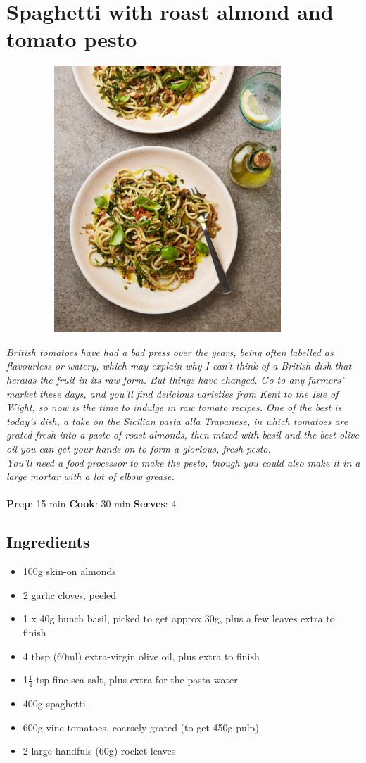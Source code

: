 \documentclass{book}
\begin{document}
\section{Spaghetti with roast almond and tomato pesto}
\begin{figure}
\centering\includegraphics[width=10cm,height=10cm,keepaspectratio]{Recipe_Pictures/Spaghetti_with_roast_almond_and_tomato_pesto.png}
\end{figure}
\emph{British tomatoes have had a bad press over the years, being often labelled as flavourless or watery, which may explain why I can’t think of a British dish that heralds the fruit in its raw form. But things have changed. Go to any farmers’ market these days, and you’ll find delicious varieties from Kent to the Isle of Wight, so now is the time to indulge in raw tomato recipes. One of the best is today’s dish, a take on the Sicilian pasta alla Trapanese, in which tomatoes are grated fresh into a paste of roast almonds, then mixed with basil and the best olive oil you can get your hands on to form a glorious, fresh pesto.\\ 
You’ll need a food processor to make the pesto, though you could also make it in a large mortar with a lot of elbow grease.}\\\\ 
\textbf{Prep}: 15 min
\textbf{Cook}: 30 min
\textbf{Serves}: 4
\subsection*{Ingredients}
\begin{itemize}
\item 100g skin-on almonds
\item 2 garlic cloves, peeled
\item 1 x 40g bunch basil, picked to get approx 30g, plus a few leaves extra to finish
\item 4 tbsp (60ml) extra-virgin olive oil, plus extra to finish
\item 1$\frac{1}{4}$ tsp fine sea salt, plus extra for the pasta water
\item 400g spaghetti
\item 600g vine tomatoes, coarsely grated (to get 450g pulp)
\item 2 large handfuls (60g) rocket leaves
\end{itemize}
\end{document}

